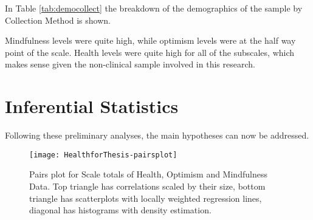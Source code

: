 \documentclass{article}
\begin{document}
In Table \ref{tab:democollect} the breakdown of the demographics
of the sample by Collection Method is shown.

\begin{table}[ht]
\centering
{}
\caption{Demographic Statistics for Sample One (paper sample)} 
\label{tab:democollect}
\end{table}

Mindfulness levels were quite high, while optimism levels were
at the half way point of the scale. Health levels were quite high for all of the subscales, which makes sense given the non-clinical sample involved in this research. 



\section{Inferential Statistics}

Following these preliminary analyses, the main hypotheses can now
be addressed.



\begin{figure}
\texttt{[image: HealthforThesis-pairsplot]}
\caption{Pairs plot for Scale totals of Health, Optimism and Mindfulness Data.  Top triangle has correlations scaled by their size, bottom triangle has scatterplots with locally weighted regression lines, diagonal has histograms with density estimation.}
\label{fig:pairsplot}
\end{figure}
\end{document}

